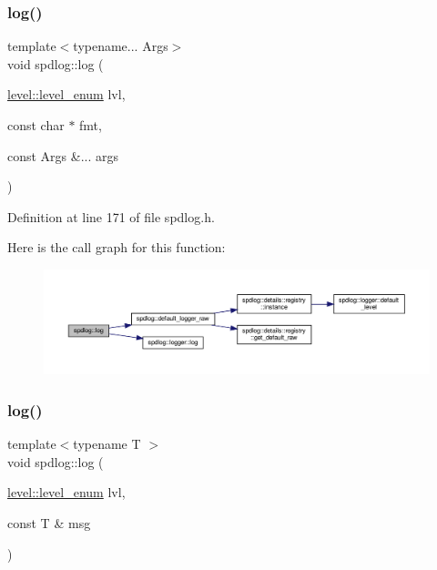 \subsubsection{\texorpdfstring{log()}{log()}\hspace{0.1cm}{\footnotesize\ttfamily [2/3]}}
{\footnotesize\ttfamily template$<$typename... Args$>$ \\
void spdlog\+::log (\begin{DoxyParamCaption}\item[{\hyperlink{namespacespdlog_1_1level_a35f5227e5daf228d28a207b7b2aefc8b}{level\+::level\+\_\+enum}}]{lvl,  }\item[{const char $\ast$}]{fmt,  }\item[{const Args \&...}]{args }\end{DoxyParamCaption})\hspace{0.3cm}{\ttfamily [inline]}}



Definition at line 171 of file spdlog.\+h.

Here is the call graph for this function\+:
\nopagebreak
\begin{figure}[H]
\begin{center}
\leavevmode
\includegraphics[width=350pt]{namespacespdlog_a7ad1ad069c196a042cb191b05d27167a_cgraph}
\end{center}
\end{figure}
\mbox{\label{namespacespdlog_aee9d401c7cb3cd8538a139af836c5ec5}} 
\subsubsection{\texorpdfstring{log()}{log()}\hspace{0.1cm}{\footnotesize\ttfamily [3/3]}}
{\footnotesize\ttfamily template$<$typename T $>$ \\
void spdlog\+::log (\begin{DoxyParamCaption}\item[{\hyperlink{namespacespdlog_1_1level_a35f5227e5daf228d28a207b7b2aefc8b}{level\+::level\+\_\+enum}}]{lvl,  }\item[{const T \&}]{msg }\end{DoxyParamCaption})\hspace{0.3cm}{\ttfamily [inline]}}




